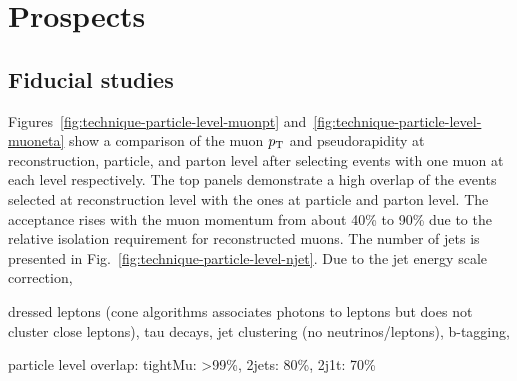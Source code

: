 \section{Prospects}


\subsection{Fiducial studies}
\label{sec:diff13-fiducial-studies}



Figures~\ref{fig:technique-particle-level-muonpt} and~\ref{fig:technique-particle-level-muoneta} show a comparison of the muon $p_\textrm{T}$ and pseudorapidity at reconstruction, particle, and parton level after selecting events with one muon at each level respectively. The top panels demonstrate a high overlap of the events selected at reconstruction level with the ones at particle and parton level. The acceptance rises with the muon momentum from about 40\% to 90\% due to the relative isolation requirement for reconstructed muons. The number of jets is presented in Fig.~\ref{fig:technique-particle-level-njet}. Due to the jet energy scale correction, 


dressed leptons (cone algorithms associates photons to leptons but does not cluster close leptons), tau decays, jet clustering (no neutrinos/leptons), b-tagging,




particle level overlap: tightMu: >99\%, 2jets: 80\%, 2j1t: 70\%



